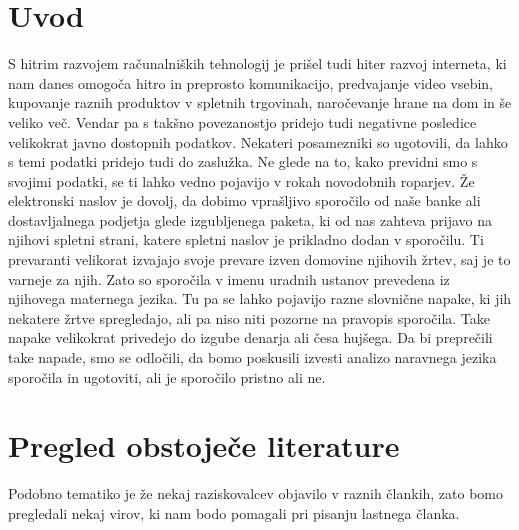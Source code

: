 \documentclass[sigconf,nonacm]{acmart}
\begin{document}
\maketitle

\section{Uvod}

S hitrim razvojem računalniških tehnologij je prišel tudi hiter razvoj interneta, ki nam danes omogoča hitro in preprosto komunikacijo, predvajanje video vsebin, kupovanje raznih produktov v spletnih trgovinah, naročevanje hrane na dom in še veliko več. Vendar pa s takšno povezanostjo pridejo tudi negativne posledice velikokrat javno dostopnih podatkov. Nekateri posamezniki so ugotovili, da lahko s temi podatki pridejo tudi do zaslužka. Ne glede na to, kako previdni smo s svojimi podatki, se ti lahko vedno pojavijo v rokah novodobnih roparjev. Že elektronski naslov je dovolj, da dobimo vprašljivo sporočilo od naše banke ali dostavljalnega podjetja glede izgubljenega paketa, ki od nas zahteva prijavo na njihovi spletni strani, katere spletni naslov je prikladno dodan v sporočilu. Ti prevaranti velikorat izvajajo svoje prevare izven domovine njihovih žrtev, saj je to varneje za njih. Zato so sporočila v imenu uradnih ustanov prevedena iz njihovega maternega jezika. Tu pa se lahko pojavijo razne slovnične napake, ki jih nekatere žrtve spregledajo, ali pa niso niti pozorne na pravopis sporočila. Take napake velikokrat privedejo do izgube denarja ali česa hujšega. Da bi preprečili take napade, smo se odločili, da bomo poskusili izvesti analizo naravnega jezika sporočila in ugotoviti, ali je sporočilo pristno ali ne.

\section{Pregled obstoječe literature}
Podobno tematiko je že nekaj raziskovalcev objavilo v raznih člankih, zato bomo pregledali nekaj virov, ki nam bodo pomagali pri pisanju lastnega članka.
\end{document}
